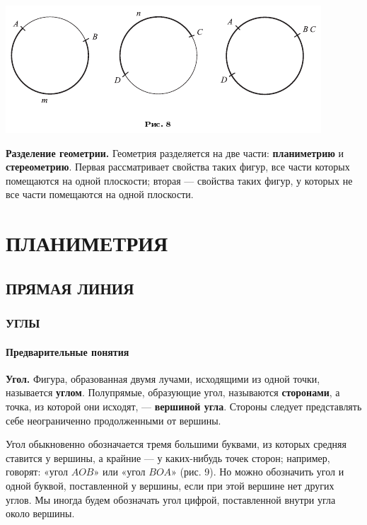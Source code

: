 \documentclass[oneside]{book}
\begin{document}
\includegraphics{pics/ris-8}

\textbf{Разделение геометрии.}
Геометрия разделяется на две части:
\textbf{планиметрию} и \textbf{стереометрию}.
Первая рассматривает свойства таких фигур, все части которых помещаются на одной плоскости;
вторая — свойства таких фигур, у которых не все части помещаются на одной плоскости.



\part{ПЛАНИМЕТРИЯ}

\chapter{ПРЯМАЯ ЛИНИЯ}


\section{УГЛЫ} 

\subsection*{Предварительные понятия}

\textbf{Угол.}
Фигура, образованная двумя лучами, исходящими из одной точки, называется \textbf{углом}.
Полупрямые, образующие угол, называются \textbf{сторонами}, а точка, из которой они исходят, — \textbf{вершиной угла}.
Стороны следует представлять себе неограниченно продолженными от вершины.

Угол обыкновенно обозначается тремя большими буквами, из которых средняя ставится у вершины, а крайние — у каких-нибудь точек сторон;
например, говорят:
«угол $AOB$» или «угол $BOA$» (рис. 9).
Но можно обозначить угол и одной буквой, поставленной у вершины, если при этой вершине нет других углов.
Мы иногда будем обозначать угол цифрой, поставленной внутри угла около вершины.
\end{document}
